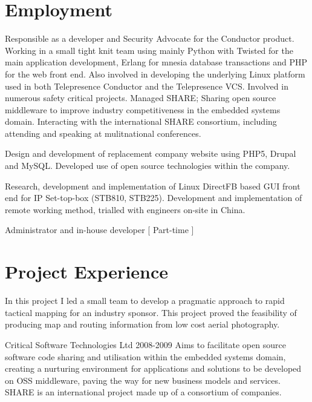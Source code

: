 \documentclass[overlapped,line,letterpaper]{res}
\begin{document}
\begin{resume}
\section{\bf Employment}
{
    Responsible as a developer and Security Advocate for the Conductor product.
    Working in a small tight knit team using mainly Python with Twisted for
    the main application development, Erlang for mnesia database transactions
    and PHP for the web front end.
    Also involved in developing the underlying Linux platform used in both
    Telepresence Conductor and the Telepresence VCS.
}
{
    Involved in numerous safety critical projects. Managed SHARE;
    Sharing open source middleware to improve industry competitiveness
    in the embedded systems domain. Interacting with the international SHARE
    consortium, including attending and speaking at mulitnational conferences.
}

{
    Design and development of replacement company website using PHP5, Drupal and
    MySQL.
    Developed use of open source technologies within the company.
}

{
    Research, development and implementation of Linux DirectFB based GUI front end
    for IP Set-top-box (STB810, STB225). Development and implementation of remote
    working method, trialled with engineers on-site in China.
}

{
    Administrator and in-house developer [ Part-time ]
}


\section{\bf Project Experience}
{
    In this project I led a small team to develop a pragmatic approach to rapid
    tactical mapping for an industry sponsor.
    This project proved the feasibility of producing map and routing information
    from low cost aerial photography.
}

  {Critical Software Technologies Ltd}
  {2008-2009}
{
    Aims to facilitate open source software code sharing and utilisation within
    the embedded systems domain, creating a nurturing environment for
    applications and solutions to be developed on OSS middleware, paving the way
    for new business models and services.
    SHARE is an international project made up of a consortium of companies.
}


\end{resume}
\end{document}
